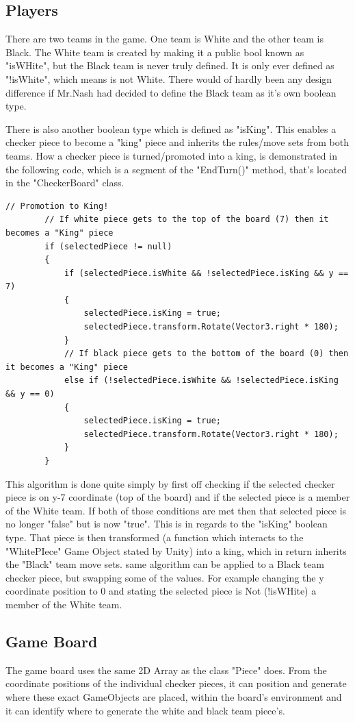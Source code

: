\documentclass[10pt, a4paper]{article}
\begin{document}
	\subsection{Players}
	There are two teams in the game. One team is White and the other team is Black. The White team is created by making it a public bool known as "isWHite", but the Black team is never truly defined. It is only ever defined as "!isWhite", which means is not White. There would of hardly been any design difference if Mr.Nash had decided to define the Black team as it's own boolean type.
	
	There is also another boolean type which is defined as "isKing". This enables a checker piece to become a "king" piece and inherits the rules/move sets from both teams. How a checker piece is turned/promoted into a king, is demonstrated in the following code, which is a segment of the "EndTurn()" method, that's located in the "CheckerBoard" class.
	\begin{lstlisting}[caption = EndTurn()]
	// Promotion to King!
        // If white piece gets to the top of the board (7) then it becomes a "King" piece
        if (selectedPiece != null)
        {
            if (selectedPiece.isWhite && !selectedPiece.isKing && y == 7)
            {
                selectedPiece.isKing = true;
                selectedPiece.transform.Rotate(Vector3.right * 180);
            }
            // If black piece gets to the bottom of the board (0) then it becomes a "King" piece
            else if (!selectedPiece.isWhite && !selectedPiece.isKing && y == 0)
            {
                selectedPiece.isKing = true;
                selectedPiece.transform.Rotate(Vector3.right * 180);
            }
        }
	\end{lstlisting}
	This algorithm is done quite simply by first off checking if the selected checker piece is on y-7 coordinate (top of the board) and if the selected piece is a member of the White team. If both of those conditions are met then that selected piece is no longer "false" but is now "true". This is in regards to the "isKing" boolean type. That piece is then transformed (a function which interacts to the "WhitePIece" Game Object stated by Unity) into a king, which in return inherits the "Black" team move sets. same algorithm can be applied to a Black team checker piece, but swapping some of the values. For example changing the y coordinate position to 0 and stating the selected piece is Not (!isWHite) a member of the White team.
	
	\subsection{Game Board}
	The game board uses the same 2D Array as the class "Piece" does. From the coordinate positions of the individual checker pieces, it can position and generate where these exact GameObjects are placed, within the board's environment and it can identify where to generate the white and black team piece's.
	
\end{document}
